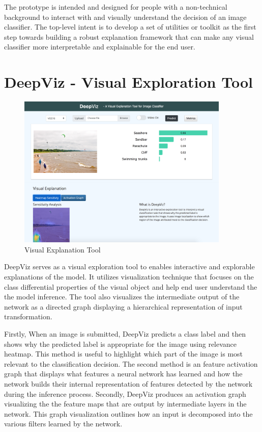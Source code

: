 The prototype is intended and designed for people with a non-technical background to interact with and visually understand the decision of an image classifier. The top-level intent is to develop a set of utilities or toolkit as the first step towards building a robust explanation framework that can make any visual classifier more interpretable and explainable for the end user.


\section{DeepViz - Visual Exploration Tool}

\begin{figure}[htbp]
\centering
\includegraphics[width=0.90\textwidth]{images/DeepViz001.png}
\caption{Visual Explanation Tool}
\label{fig:DeepViz - Visual Explanation Tool}
\end{figure}

DeepViz serves as a visual exploration tool to enables interactive and explorable explanations of the model. It utilizes visualization technique that focuses on the class differential properties of the visual object and help end user understand the the model inference. The tool also visualizes the intermediate output of the network as a directed graph displaying a hierarchical representation of input transformation.

Firstly, When an image is submitted, DeepViz predicts a class label and then shows why the predicted label is appropriate for the image using relevance heatmap. This method is useful to highlight which part of the image is most relevant to the classification decision. The second method is an feature activation graph that displays what features a neural network has learned and how the network builds their internal representation of  features detected by the network during the inference process. Secondly, DeepViz produces an activation graph visualizing the the feature maps that are output by intermediate layers in the network. This graph visualization outlines how an input is decomposed into the various filters learned by the network.

